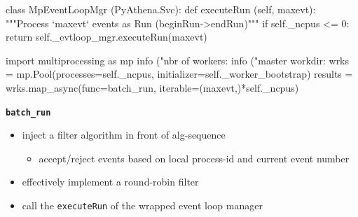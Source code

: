 \documentclass[10pt]{beamer}
\newcommand{\myred}  [1] {{\color{red}#1}}
\begin{document}
\begin{frame}[fragile]{}


\begin{python}
class MpEventLoopMgr (PyAthena.Svc):
    def executeRun (self, maxevt):
        """Process `maxevt` events as Run (beginRun->endRun)"""
        if self._ncpus <= 0:
            return self._evtloop_mgr.executeRun(maxevt)

        import multiprocessing as mp
        info ("nbr of workers: %
        info ("master workdir: %
        wrks = mp.Pool(processes=self._ncpus,
                       initializer=self._worker_bootstrap)
        results = wrks.map_async(func=batch_run,
                                 iterable=(maxevt,)*self._ncpus)
\end{python}

\begin{exampleblock}{\bf{\myred{\texttt{batch\_run}}}}
\begin{itemize}
  \item inject a filter algorithm in front of alg-sequence
    \begin{itemize}
      \item accept/reject events based on local process-id and current event number
    \end{itemize}
  \item effectively implement a round-robin filter
  \item call the \myred{\texttt{executeRun}} of the wrapped event loop manager
\end{itemize}
\end{exampleblock}
\end{frame}
\end{document}
